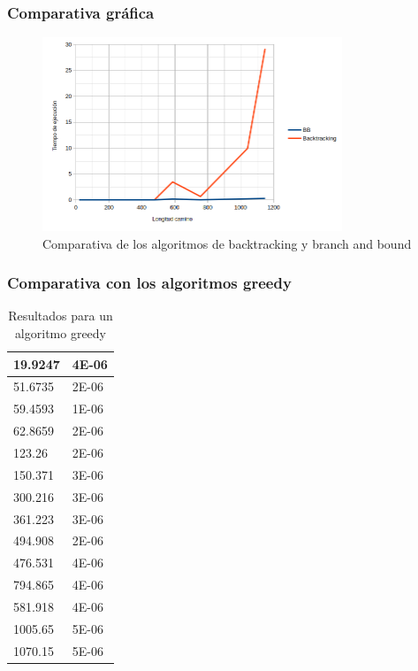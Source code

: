\documentclass[spanish]{beamer}
\begin{document}
\begin{frame}[fragile]\frametitle{Comparativa gráfica}	
\begin{figure}[H]
	\centering
	\includegraphics[width=0.8\textwidth]{comparativa.png}
	\caption{Comparativa de los algoritmos de backtracking y branch and bound}
\end{figure}
\end{frame}

\begin{frame}[fragile]\frametitle{Comparativa con los algoritmos greedy}
\begin{table}[H]
	\centering
	\caption{Resultados para un algoritmo greedy}
	\label{my-label}
	\begin{tabular}{|l|l|}
		\hline
		19.9247 & 4E-06 \\ \hline
		51.6735 & 2E-06 \\ \hline
		59.4593 & 1E-06 \\ \hline
		62.8659 & 2E-06 \\ \hline
		123.26  & 2E-06 \\ \hline
		150.371 & 3E-06 \\ \hline
		300.216 & 3E-06 \\ \hline
		361.223 & 3E-06 \\ \hline
		494.908 & 2E-06 \\ \hline
		476.531 & 4E-06 \\ \hline
		794.865 & 4E-06 \\ \hline
		581.918 & 4E-06 \\ \hline
		1005.65 & 5E-06 \\ \hline
		1070.15 & 5E-06 \\ \hline
	\end{tabular}
\end{table}
\end{frame}
\end{document}
